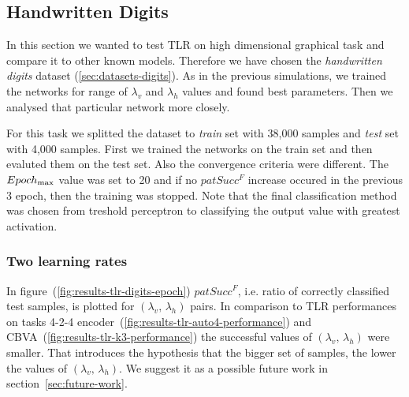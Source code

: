 

\subsection{Handwritten Digits} 
\label{sec:results-digits} 

In this section we wanted to test TLR on high dimensional graphical task and compare it to other known models. Therefore we have chosen the \emph{handwritten digits} dataset (\ref{sec:datasets-digits}). As in the previous simulations, we trained the networks for range of $\lambda_v$ and $\lambda_h$ values and found best parameters. Then we analysed that particular network more closely. 

For this task we splitted the dataset to \emph{train} set with 38,000 samples and \emph{test} set with 4,000 samples. First we trained the networks on the train set and then evaluted them on the test set. Also the convergence criteria were different. The $Epoch_{\rm max}$ value was set to 20 and if no $patSucc^F$ increase occured in the previous 3 epoch, then the training was stopped. Note that the final classification method was chosen from treshold perceptron to classifying the output value with greatest activation. 

\subsubsection{Two learning rates} 
\label{sec:tlr-digits} 
In figure~(\ref{fig:results-tlr-digits-epoch}) $patSucc^F$, i.e. ratio of correctly classified test samples, is plotted for $(\lambda_v,\, \lambda_h)$ pairs. In comparison to TLR performances on tasks 4-2-4 encoder~(\ref{fig:results-tlr-auto4-performance}) and CBVA~(\ref{fig:results-tlr-k3-performance}) the successful values of $(\lambda_v,\, \lambda_h)$ were smaller. That introduces the hypothesis that the bigger set of samples, the lower the values of $(\lambda_v,\, \lambda_h)$. We suggest it as a possible future work in section~\ref{sec:future-work}. 

